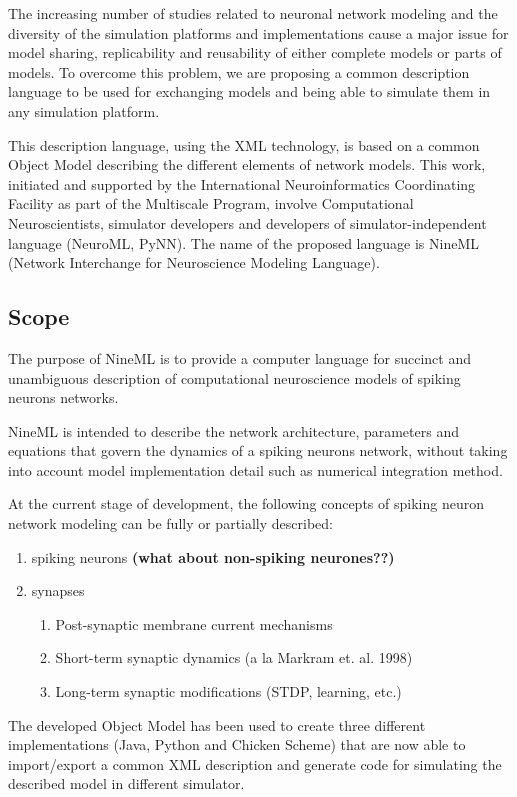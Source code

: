 \documentclass[draftspec]{ninemlspec}
\begin{document}
The increasing number of studies related to neuronal network modeling
and the diversity of the simulation platforms and implementations
cause a major issue for model sharing, replicability and reusability
of either complete models or parts of models. To overcome this problem,
we are proposing a
common description language to be used for exchanging models and being
able to simulate them in any simulation platform.

This description language, using the XML technology, is based on a
common Object Model describing the different elements of network
models. This work, initiated and supported by the International
Neuroinformatics Coordinating Facility as part of the Multiscale
Program, involve Computational Neuroscientists, simulator developers and
developers of simulator-independent language (NeuroML, PyNN).  The name of the
proposed language is NineML (Network Interchange for Neuroscience Modeling
Language).

\subsection{Scope}

The purpose of NineML is to provide a computer language for
succinct and unambiguous description of computational neuroscience models of
spiking neurons networks.

NineML is intended to describe the network architecture, parameters
and equations that govern the dynamics of a spiking neurons network, without
taking into account model implementation detail such as numerical integration
method.

At the current stage of development, the following concepts of spiking neuron
network modeling can be fully or partially described:

\begin{enumerate}
\item spiking neurons \textbf{(what about non-spiking neurones??)}
\item synapses
\begin{enumerate}
\item Post-synaptic membrane current mechanisms
\item Short-term synaptic dynamics (a la Markram et. al. 1998)
\item Long-term synaptic modifications (STDP, learning, etc.)
\end{enumerate}
\end{enumerate}

The developed Object Model has been used to create three different
implementations (Java, Python and Chicken Scheme) that are now able to
import/export a common XML description and generate code for simulating the
described model in different simulator.
\end{document}
